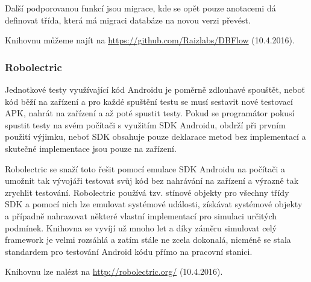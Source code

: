 \documentclass[czech,master,public,dept460,male,java,cpdeclaration]{diploma}
\begin{document}
  Další podporovanou funkcí jsou migrace, kde se opět pouze anotacemi dá definovat třída,
  která má migraci databáze na novou verzi převést.

  Knihovnu můžeme najít na \url{https://github.com/Raizlabs/DBFlow}  (10.4.2016).


\subsubsection{Robolectric}\label{robolectric}
Jednotkové testy využívající kód Androidu je poměrně zdlouhavé spouštět, neboť kód běží na
zařízení a pro každé spuštění testu se musí sestavit nové testovací APK, nahrát na zařízení
a až poté spustit testy. Pokud se programátor pokusí spustit testy na svém počítači s využitím
SDK Androidu, obdrží při prvním použití výjimku, neboť SDK obsahuje pouze deklarace metod
bez implementací a skutečné implementace jsou pouze na zařízení.

Robolectric se snaží toto řešit pomocí emulace SDK Androidu na počítači a umožnit tak vývojáři
testovat svůj kód bez nahrávání na zařízení a výrazně tak zrychlit testování. Robolectric
používá tzv. stínové objekty pro všechny třídy SDK a pomocí nich lze emulovat systémové události,
získávat systémové objekty a případně nahrazovat některé vlastní implementací pro simulaci
určitých podmínek. Knihovna se vyvíjí už mnoho let a díky záměru simulovat celý framework je velmi
rozsáhlá a zatím stále ne zcela dokonalá, nicméně se stala standardem pro testování Android kódu
přímo na pracovní stanici.

Knihovnu lze nalézt na \url{http://robolectric.org/}  (10.4.2016).
\end{document}
